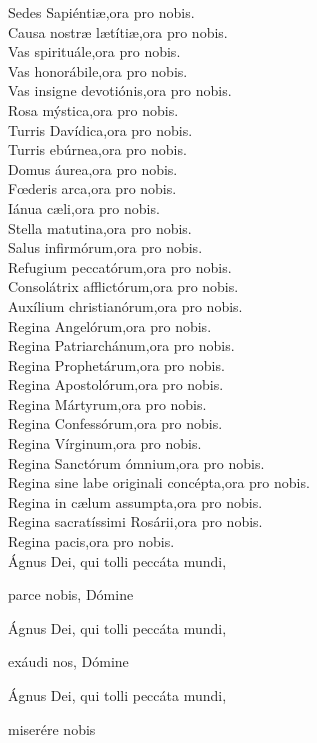 Sedes Sapiénti{\ae},{\hfill}ora pro nobis.\\
Causa nostr{\ae} l{\ae}títi{\ae},{\hfill}ora pro nobis.\\
Vas spirituále,{\hfill}ora pro nobis.\\
Vas honorábile,{\hfill}ora pro nobis.\\
Vas insigne devotiónis,{\hfill}ora pro nobis.\\
Rosa mýstica,{\hfill}ora pro nobis.\\
Turris Davídica,{\hfill}ora pro nobis.\\
Turris ebúrnea,{\hfill}ora pro nobis.\\
Domus áurea,{\hfill}ora pro nobis.\\
F{\oe}deris arca,{\hfill}ora pro nobis.\\
Iánua c{\ae}li,{\hfill}ora pro nobis.\\
Stella matutina,{\hfill}ora pro nobis.\\
Salus infirmórum,{\hfill}ora pro nobis.\\
Refugium peccatórum,{\hfill}ora pro nobis.\\
Consolátrix afflictórum,{\hfill}ora pro nobis.\\
Auxílium christianórum,{\hfill}ora pro nobis.\\
Regina Angelórum,{\hfill}ora pro nobis.\\
Regina Patriarchánum,{\hfill}ora pro nobis.\\
Regina Prophetárum,{\hfill}ora pro nobis.\\
Regina Apostolórum,{\hfill}ora pro nobis.\\
Regina Mártyrum,{\hfill}ora pro nobis.\\
Regina Confessórum,{\hfill}ora pro nobis.\\
Regina Vírginum,{\hfill}ora pro nobis.\\
Regina Sanctórum ómnium,{\hfill}ora pro nobis.\\
Regina sine labe originali concépta,{\hfill}ora pro nobis.\\
Regina in c{\ae}lum assumpta,{\hfill}ora pro nobis.\\
Regina sacratíssimi Rosárii,{\hfill}ora pro nobis.\\
Regina pacis,{\hfill}ora pro nobis.\\
Ágnus Dei, qui tolli peccáta mundi,

\hspace*{\fill}parce nobis, Dómine  

Ágnus Dei, qui tolli peccáta mundi, 

\hspace*{\fill}exáudi nos, Dómine

Ágnus Dei, qui tolli peccáta mundi, 

\hspace*{\fill}miserére nobis

